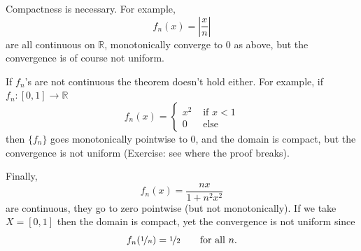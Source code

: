 \documentclass[12pt]{book}
\newcommand{\abs}[1]{\left\lvert {#1} \right\rvert}
\newcommand{\R}{{\mathbb{R}}}
\theoremstyle{plain}
\theoremstyle{remark}
\theoremstyle{definition}
\theoremstyle{exercise}
\theoremstyle{example}
\begin{document}
Compactness is necessary.  For example,
\begin{equation*}
f_n(x) = \abs{\frac{x}{n}}
\end{equation*}
are all continuous on $\R$, monotonically converge to 0 as above, but
the convergence is of course not uniform.

If $f_n$'s are not continuous the theorem doesn't hold either.  For example,
if $f_n \colon [0,1] \to \R$
\begin{equation*}
f_n(x) = \begin{cases}
x^2 & \text{ if $x < 1$}\\
0 & \text{ else}
\end{cases}
\end{equation*}
then $\{f_n\}$ goes monotonically pointwise to 0, and the domain is compact, but the convergence is not
uniform (Exercise: see where the proof breaks).

Finally,
\begin{equation*}
f_n(x) = \frac{nx}{1+n^2x^2}
\end{equation*}
are continuous, they go to zero pointwise (but not monotonically).  If we
take $X=[0,1]$ then the domain is compact, yet the convergence is not uniform
since
\begin{equation*}
f_n(\nicefrac{1}{n}) = \nicefrac{1}{2} \qquad \text{for all $n$.}
\end{equation*}
\end{document}
